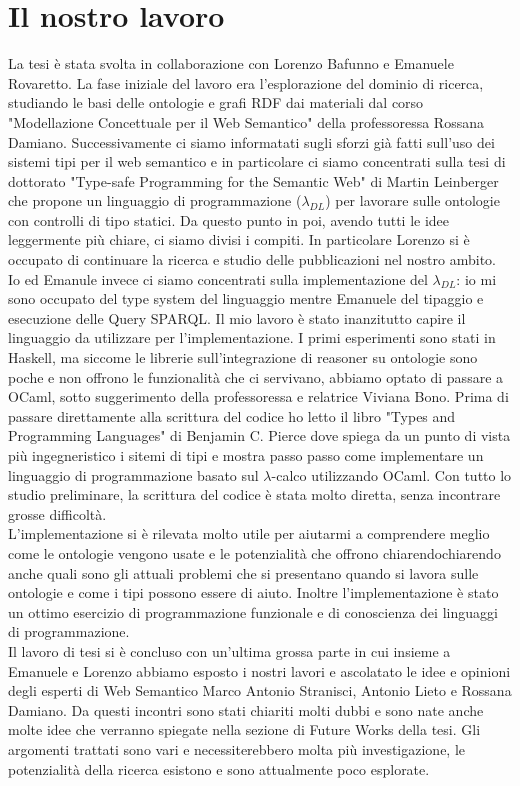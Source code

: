\section{Il nostro lavoro}
    La tesi è stata svolta in collaborazione con Lorenzo Bafunno e Emanuele Rovaretto. La fase iniziale del lavoro era l'esplorazione del dominio di ricerca,
    studiando le basi delle ontologie e grafi RDF dai materiali dal corso "Modellazione Concettuale per il Web Semantico" della professoressa Rossana Damiano.
    Successivamente ci siamo informatati sugli sforzi già fatti sull'uso dei sistemi tipi per il web semantico e in particolare ci siamo concentrati sulla tesi di
    dottorato "Type-safe Programming for the Semantic Web" di Martin Leinberger che propone un linguaggio di programmazione ($\lambda_{DL}$) per lavorare sulle ontologie con 
    controlli di tipo statici. Da questo punto in poi, avendo tutti le idee leggermente più chiare, ci siamo divisi i compiti. In particolare Lorenzo si
    è occupato di continuare la ricerca e studio delle pubblicazioni nel nostro ambito. Io ed Emanule invece ci siamo concentrati sulla implementazione
    del $\lambda_{DL}$: io mi sono occupato del type system del linguaggio mentre Emanuele del tipaggio e esecuzione delle Query SPARQL.
    Il mio lavoro è stato inanzitutto capire il linguaggio da utilizzare per l'implementazione. I primi esperimenti sono stati in Haskell, ma siccome le librerie
    sull'integrazione di reasoner su ontologie sono poche e non offrono le funzionalità che ci servivano, abbiamo optato di passare a OCaml, sotto suggerimento della professoressa e relatrice Viviana Bono. 
    Prima di passare direttamente alla scrittura del codice ho letto il libro "Types and Programming Languages" di Benjamin C. Pierce dove spiega da un punto di vista
    più ingegneristico i sitemi di tipi e mostra passo passo come implementare un linguaggio di programmazione basato sul $\lambda$-calco utilizzando OCaml.
    Con tutto lo studio preliminare, la scrittura del codice è stata molto diretta, senza incontrare grosse difficoltà.
    \\L'implementazione si è rilevata molto utile per aiutarmi a comprendere meglio come le ontologie vengono usate e le potenzialità che offrono chiarendochiarendo anche
    quali sono gli attuali problemi che si presentano quando si lavora sulle ontologie e come i tipi possono essere di aiuto. Inoltre l'implementazione è stato un ottimo
    esercizio di programmazione funzionale e di conoscienza dei linguaggi di programmazione.
    \\Il lavoro di tesi si è concluso con un'ultima grossa parte in cui insieme a Emanuele e Lorenzo abbiamo esposto i nostri lavori e ascolatato le idee e opinioni degli esperti
    di Web Semantico Marco Antonio Stranisci, Antonio Lieto e Rossana Damiano. Da questi incontri sono stati chiariti molti dubbi e sono nate anche molte idee che verranno
    spiegate nella sezione di Future Works della tesi. Gli argomenti trattati sono vari e necessiterebbero molta più investigazione, le potenzialità della ricerca esistono
    e sono attualmente poco esplorate. 